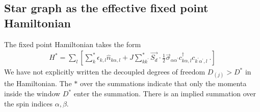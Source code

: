 \documentclass[reprint,prb,superscriptaddress]{revtex4-2}
\begin{document}
\subsection{Star graph as the effective fixed point Hamiltonian}
The fixed point Hamiltonian takes the form
\begin{equation}\begin{aligned}
	H^* = \sum_l\left[ \sum^*_{k}\epsilon_{k,l} \hat n_{k\alpha,l} + J\sum_{kk^\prime}^* \vec{S_d}\cdot\frac{1}{2}\vec{\sigma}_{\alpha\alpha^\prime}c_{k\alpha,l}^\dagger c_{k^\prime\alpha^\prime, l}~.\right]
\end{aligned}\end{equation}
We have not explicitly written the decoupled degrees of freedom \(D_{(j)} > D^*\) in the Hamiltonian. The \(*\) over the summations indicate that only the momenta inside the window \(D^*\) enter the summation. There is an implied summation over the spin indices \(\alpha,\beta\).
\end{document}
